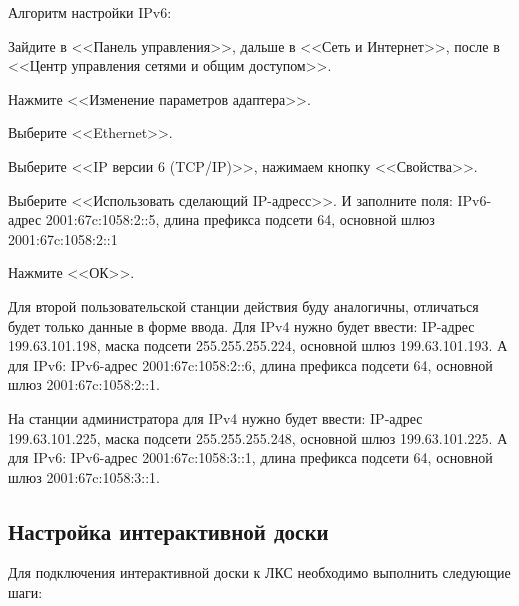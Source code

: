 Алгоритм настройки IPv6:
\begin{enumerate_num}
    \item Зайдите в <<Панель управления>>, дальше в <<Сеть и Интернет>>, после в <<Центр управления сетями и общим доступом>>.
    \item Нажмите <<Изменение параметров адаптера>>.
    \item Выберите <<Ethernet>>.
    \item Выберите <<IP версии 6 (TCP/IP)>>, нажимаем кнопку <<Свойства>>. 
    \item Выберите <<Использовать сделающий IP-адресс>>. И заполните поля: IPv6-адрес 2001:67c:1058:2::5, длина префикса подсети 64, основной шлюз 2001:67c:1058:2::1
    \item Нажмите <<ОК>>.
\end{enumerate_num}

Для второй пользовательской станции действия буду аналогичны, отличаться будет только данные в форме ввода. Для IPv4 нужно будет ввести: IP-адрес 199.63.101.198, маска подсети 255.255.255.224, основной шлюз 199.63.101.193. А для IPv6: IPv6-адрес 2001:67c:1058:2::6, длина префикса подсети 64, основной шлюз 2001:67c:1058:2::1.

На станции администратора для IPv4 нужно будет ввести: IP-адрес 199.63.101.225, маска подсети 255.255.255.248, основной шлюз 199.63.101.225. А для IPv6: IPv6-адрес 2001:67c:1058:3::1, длина префикса подсети 64, основной шлюз 2001:67c:1058:3::1.

\subsection{Настройка интерактивной доски}

Для подключения интерактивной доски к ЛКС необходимо выполнить следующие шаги:


